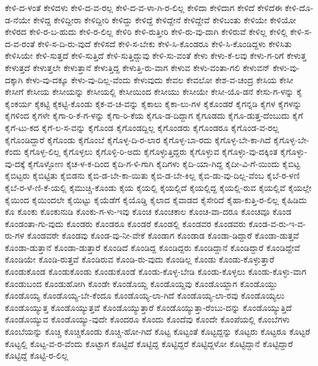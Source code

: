 {ಕೇಳಿ-ದ-ಳಂತೆ
ಕೇಳಿದಳು
ಕೇಳಿ-ದ-ವ-ರಲ್ಲ
ಕೇಳಿ-ದ-ವ-ಳಾ-ಗಿ-ರ-ಲಿಲ್ಲ
ಕೇಳಿದಾ
ಕೇಳಿದಾಗ
ಕೇಳಿದೆ
ಕೇಳಿದೆಈ
ಕೇಳಿ-ದೊ-ಡ-ನೆಯೇ
ಕೇಳಿದ್ದ
ಕೇಳಿದ್ದೀರಾ
ಕೇಳಿದ್ದೀರಿ
ಕೇಳಿದ್ದು
ಕೇಳಿದ್ದೆ
ಕೇಳಿದ್ದೇನೆ
ಕೇಳಿದ್ದೇವೆ
ಕೇಳಿಬಂತು
ಕೇಳಿಯೇ
ಕೇಳಿಯೋ
ಕೇಳಿರದ
ಕೇಳಿ-ರ-ಬ-ಹುದು
ಕೇಳಿ-ರ-ಲಿಲ್ಲ
ಕೇಳಿರಿ
ಕೇಳಿ-ರುತ್ತೀರಿ
ಕೇಳಿ-ರು-ವು-ದಾಗಿ
ಕೇಳಿರುವೆ
ಕೇಳಿಲ್ಲ
ಕೇಳಿಲ್ಲಿ
ಕೇಳಿ-ಸ-ದ-ವ-ರಂತೆ
ಕೇಳಿ-ಸ-ದಿ-ರು-ವುದೆ
ಕೇಳಿಸದೆ
ಕೇಳಿ-ಸ-ಬೇಕು
ಕೇಳಿ-ಸಿ-ಕೊಂಡರೂ
ಕೇಳಿ-ಸಿ-ಕೊಂಡಿದ್ದಳು
ಕೇಳಿಸಿತು
ಕೇಳಿಸಿಯೇ
ಕೇಳಿ-ಸುತ್ತದೆ
ಕೇಳಿ-ಸುತ್ತಿದೆ
ಕೇಳಿ-ಸುತ್ತಿದ್ದುವು
ಕೇಳಿ-ಸು-ವಂತೆ
ಕೇಳು
ಕೇಳು-ಕೆ-ಲವು
ಕೇಳು-ಗ-ರಿಗೆ
ಕೇಳುತ್ತ
ಕೇಳುತ್ತದೆ
ಕೇಳುತ್ತಲೇ
ಕೇಳುತ್ತಾನೆ
ಕೇಳುತ್ತಿದ್ದ
ಕೇಳುತ್ತಿ-ರು-ವಾಗ
ಕೇಳುವ
ಕೇಳು-ವಂತಾ-ಗಲಿ
ಕೇಳುವನ್
ಕೇಳು-ವು-ದಕ್ಕಾಗಿ
ಕೇಳು-ವು-ದಕ್ಕೂ
ಕೇಳು-ವು-ದಿಲ್ಲ-ವೆಂದು
ಕೇಳುವುದು
ಕೇವಲ
ಕೇವಲೋ
ಕೇಶ-ವ-ಚಂದ್ರ
ಕೇಸಿಯ
ಕೇಸೀ
ಕೇಸೀಗೆ
ಕೇಸೀಯ
ಕೇಸೀಯನ್ನು
ಕೇಸೀಯಲ್ಲಿ
ಕೇಸೀಯಿಂದ
ಕೇಸೀಯು
ಕೇಸೀಯೇ
ಕೇಸೀ-ಯೊ-ಡನೆ
ಕೇಸು-ಗ-ಳನ್ನು
ಕೈ
ಕೈಂಕರ್ಯ
ಕೈಕಟ್ಟಿ
ಕೈಕಟ್ಟಿ-ಕೊಂಡು
ಕೈಕ-ವ-ಚ-ವನ್ನು
ಕೈಕಾಲು
ಕೈಕಾ-ಲು-ಗಳ
ಕೈಕೊಂಡರೆ
ಕೈಗನ್ನಡಿ
ಕೈಗಳ
ಕೈಗಳನ್ನು
ಕೈಗಳಿಂದ
ಕೈಗಳೇ
ಕೈಗಾ-ರಿ-ಕೆ-ಗ-ಳನ್ನು
ಕೈಗಾ-ರಿ-ಕೆಯ
ಕೈಗೂ-ಡ-ದಿದ್ದಾಗ
ಕೈಗೂಡದು
ಕೈಗೂ-ಡುತ್ತ-ದೆಂಬುದು
ಕೈಗೆ
ಕೈಗೆ-ಟು-ಕದ
ಕೈಗೆ-ಲ-ಸ-ವನ್ನು
ಕೈಗೊಂಡ
ಕೈಗೊಂಡದ್ದಿಲ್ಲ
ಕೈಗೊಂಡರು
ಕೈಗೊಂಡರೂ
ಕೈಗೊಂಡ-ವ-ರಲ್ಲ
ಕೈಗೊಂಡಿದ್ದಾರೆ
ಕೈಗೊಂಡು
ಕೈಗೊಂಬೆ
ಕೈಗೊಳ್ಳ-ದಿ-ರ-ಲಾರ
ಕೈಗೊಳ್ಳ-ಬಾ-ರದು
ಕೈಗೊಳ್ಳ-ಬೇ-ಕಾ-ಗಿದೆ
ಕೈಗೊಳ್ಳ-ಬೇ-ಕೆಂದು
ಕೈಗೊಳ್ಳ-ಲಿಲ್ಲ
ಕೈಗೊಳ್ಳಲು
ಕೈಗೊಳ್ಳಿ-ರಿ-ಅದು
ಕೈಗೊಳ್ಳುತ್ತಿದ್ದರು
ಕೈಗೊಳ್ಳುವ
ಕೈಗೊಳ್ಳು-ವು-ದಕ್ಕಿಂತ
ಕೈಗೊಳ್ಳು-ವು-ದಕ್ಕೆ
ಕೈಗೊಳ್ಳೋಣ
ಕೈಚ-ಳ-ಕ-ದಿಂದ
ಕೈದಿ-ಗ-ಳಿ-ಗಾಗಿ
ಕೈದಿಗಳು
ಕೈದಿ-ಯಾ-ಗಿದ್ದ
ಕೈದೀ-ವಿ-ಗೆ-ಯಿಂದು
ಕೈಬಿಟ್ಟ
ಕೈಬಿಟ್ಟರು
ಕೈಬಿಟ್ಟಿತು
ಕೈಬಿಡನು
ಕೈಬಿ-ಡ-ಬೇ-ಕಾ-ಯಿತು
ಕೈಬಿ-ಡ-ಬೇ-ಕಿಲ್ಲ
ಕೈಬಿ-ಡು-ವು-ದಿಲ್ಲ-ವೆಂಬ
ಕೈಬೆ-ರ-ಳಣಿ
ಕೈಬೆ-ರ-ಳೆ-ಣಿ-ಕೆ-ಯಲ್ಲಿ
ಕೈಮುಚ್ಚಿ-ಕೊಂಡು
ಕೈಯ
ಕೈಯಲ್ಲಿ
ಕೈಯಲ್ಲಿದೆ
ಕೈಯಲ್ಲಿದ್ದ
ಕೈಯಲ್ಲಿ-ರುವ
ಕೈಯಲ್ಲಿವೆ
ಕೈಯಲ್ಲೇ
ಕೈಯಿಂದ
ಕೈಯಿಂದಲೇ
ಕೈಯಿಟ್ಟು
ಕೈಯೆಡೆಗೆ
ಕೈಯೊಡ್ಡಿ
ಕೈಲಾದ
ಕೈವಾಡದ
ಕೈಸೇರಿದೆ
ಕೈಹಾ-ಕುತ್ತಿ-ರ-ಲಿಲ್ಲ
ಕೈಹಿಡಿದು
ಕೊ
ಕೊಂಕು
ಕೊಂಕುನುಡಿ
ಕೊಂಕು-ಗ-ಳು-ಇವು
ಕೊಂಚ
ಕೊಂಚಕಾಲ
ಕೊಂಚ-ವಾ-ದರೂ
ಕೊಂಚವೂ
ಕೊಂಡ
ಕೊಂಡಂತಾ-ಗು-ವುದು
ಕೊಂಡರು
ಕೊಂಡರೂ
ಕೊಂಡರೆ
ಕೊಂಡಲ್ಲಿ
ಕೊಂಡವರ
ಕೊಂಡವರು
ಕೊಂಡ-ವ-ರು-ಇ-ವ-ರು-ಗಳ
ಕೊಂಡವರೇ
ಕೊಂಡವು
ಕೊಂಡ-ವು-ನೀ-ವೇಕೆ
ಕೊಂಡಾಗ
ಕೊಂಡಾಡ
ಕೊಂಡಾ-ಡಿದ್ದಾರೆ
ಕೊಂಡಾ-ಡುತ್ತವೆ
ಕೊಂಡಾ-ಡುತ್ತಾನೆ
ಕೊಂಡಾ-ಡುತ್ತಾರೆ
ಕೊಂಡಿದೆ
ಕೊಂಡಿದ್ದ
ಕೊಂಡಿದ್ದರು
ಕೊಂಡಿದ್ದಾನೆ
ಕೊಂಡಿದ್ದಾರೆ
ಕೊಂಡಿದ್ದೇವೆ
ಕೊಂಡಿಯೇ
ಕೊಂಡಿ-ರುತ್ತವೆ
ಕೊಂಡಿರುವ
ಕೊಂಡಿ-ರು-ವುದು
ಕೊಂಡಿಲ್ಲ
ಕೊಂಡು
ಕೊಂಡು-ಕೊಳ್ಳುತ್ತಾರೆ
ಕೊಂಡುಕೊಂಡ
ಕೊಂಡುಕೊಂಡು
ಕೊಂಡುಕೊಂಡೆ
ಕೊಂಡು-ಕೊಳ್ಳ-ಬೇಡಿ
ಕೊಂಡು-ಕೊಳ್ಳಲು
ಕೊಂಡು-ಕೊಳ್ಳು-ವಾಗ
ಕೊಂಡುಬಂದ
ಕೊಂಡುಹೋಗಿ
ಕೊಂಡೇ
ಕೊಂಡೊಯ್ದ
ಕೊಂಡೊಯ್ದವು
ಕೊಂಡೊಯ್ದಾಗ
ಕೊಂಡೊಯ್ದು
ಕೊಂಡೊಯ್ಯ
ಕೊಂಡೊಯ್ಯ-ಬೇ-ಕೆಂದೂ
ಕೊಂಡೊಯ್ಯ-ಲಾ-ಗಿದೆ
ಕೊಂಡೊಯ್ಯ-ಲಾ-ರವು
ಕೊಂಡೊಯ್ಯಲು
ಕೊಂಡೊಯ್ಯುತ್ತ
ಕೊಂಡೊಯ್ಯುತ್ತವೆ
ಕೊಂಡೊಯ್ಯುತ್ತಾರೆ
ಕೊಂಡೊಯ್ಯುತ್ತಾ-ರೆಂಬು-ದನ್ನು
ಕೊಂಡೊಯ್ಯುತ್ತಿದೆ
ಕೊಂಡೊಯ್ಯುವ
ಕೊಂಡೊಯ್ಯು-ವುದೇ
ಕೊಂದರೂ
ಕೊಂದು
ಕೊಂದೆವು
ಕೊಂದೇ
ಕೊಂಪೆಯಲ್ಲಿ
ಕೊಂಬೆಗಳು
ಕೊಂಬೆಯನ್ನು
ಕೊಚ್ಚಿ
ಕೊಚ್ಚಿಕೊಂಡು
ಕೊಚ್ಚಿ-ಹೋ-ಗಿದೆ
ಕೊಟ್ಟ
ಕೊಟ್ಟಂತೆ
ಕೊಟ್ಟದ್ದನ್ನು
ಕೊಟ್ಟರು
ಕೊಟ್ಟರೂ
ಕೊಟ್ಟರೆ
ಕೊಟ್ಟಲ್ಲಿ
ಕೊಟ್ಟ-ವ-ರ-ವೆಂದು
ಕೊಟ್ಟಾಗ
ಕೊಟ್ಟಿದೆ
ಕೊಟ್ಟಿದ್ದ
ಕೊಟ್ಟಿದ್ದರೆ
ಕೊಟ್ಟಿದ್ದಳೋ
ಕೊಟ್ಟಿದ್ದಾನೆ
ಕೊಟ್ಟಿದ್ದಾರೆ
ಕೊಟ್ಟಿದ್ದೆ
ಕೊಟ್ಟಿ-ರ-ಲಿಲ್ಲ
}
